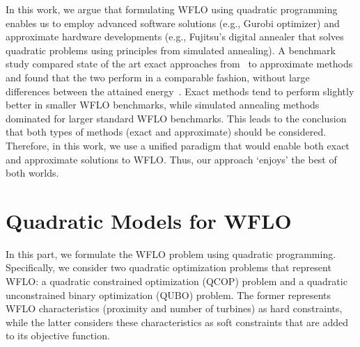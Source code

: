 \documentclass[preprint,12pt]{elsarticle}
\begin{document}
In this work, we argue that 
formulating WFLO using quadratic programming enables us to employ 
advanced software solutions (e.g., Gurobi optimizer) and approximate hardware developments 
(e.g., Fujitsu's digital annealer that solves quadratic problems using principles from simulated annealing). 
A benchmark study compared state of the art exact approaches from~\cite{Zhang2014} to 
approximate methods and found that the two perform in a comparable fashion, without large differences between
the attained energy~\cite{yang2019simulated}. Exact methods tend to perform slightly better
in smaller WFLO benchmarks, while simulated annealing methods dominated for larger standard WFLO benchmarks. 
This leads to the conclusion that both types of methods (exact and approximate) should be considered. 
Therefore, in this work, we use a unified paradigm that would enable both exact and approximate solutions to WFLO. Thus, 
our approach `enjoys' the best of both worlds. 

%
%
%
%
%
%


\section{Quadratic Models for WFLO}
\label{sec:QUBO4WFLO}

In this part, 
we formulate the WFLO problem
using quadratic programming. Specifically, we consider two
quadratic optimization problems that represent WFLO: a
quadratic constrained optimization (QCOP) problem and 
a quadratic unconstrained binary optimization (QUBO) problem. 
The former represents WFLO characteristics (proximity and number of turbines)
as hard constraints, while the latter considers these characteristics as soft constraints that are added to its objective function.
\end{document}
